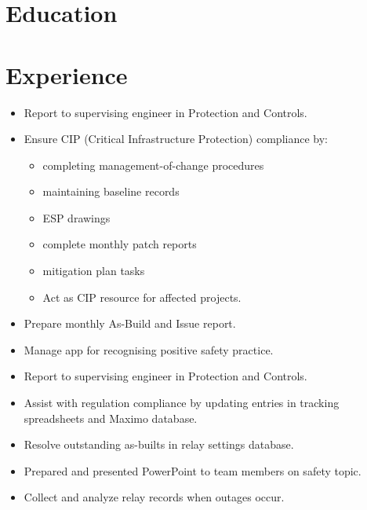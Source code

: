 \documentclass{lsanche_cv}
\begin{document}

\medskip


\smallskip


\begin{multicols*}{2}
  \section{Education}

  \section{Experience}
    \begin{itemize}
      \item Report to supervising engineer in Protection and Controls.
			\item Ensure CIP (Critical Infrastructure Protection) compliance by:
            \begin{itemize}
              \item completing management-of-change procedures
              \item maintaining baseline records
              \item ESP drawings
              \item complete monthly patch reports
              \item mitigation plan tasks
              \item Act as CIP resource for affected projects.
            \end{itemize}
			\item Prepare monthly As-Build and Issue report.
			\item Manage app for recognising positive safety practice.
    \end{itemize}

	\divider

    \begin{itemize}
      \item Report to supervising engineer in Protection and Controls.
			\item Assist with regulation compliance by updating entries in tracking spreadsheets and Maximo database.
			\item Resolve outstanding as-builts in relay settings database.
			\item Prepared and presented PowerPoint to team members on safety topic.
			\item Collect and analyze relay records when outages occur.
    \end{itemize}


\end{multicols*}
\end{document}

